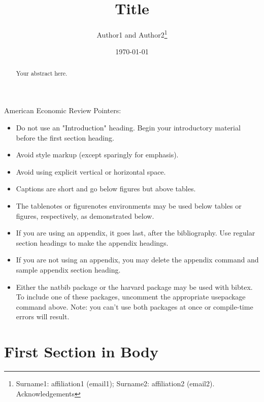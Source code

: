 \documentclass[AER]{AEA}
\begin{document}
\title{Title}
\author{Author1 and Author2\thanks{Surname1: affiliation1 (email1); 
Surname2: affiliation2 (email2). Acknowledgements}}
\date{\today}

\begin{abstract}
Your abstract here.
\end{abstract}


\maketitle

American Economic Review Pointers:

\begin{itemize}
\item Do not use an "Introduction" heading. Begin your introductory material
before the first section heading.

\item Avoid style markup (except sparingly for emphasis).

\item Avoid using explicit vertical or horizontal space.

\item Captions are short and go below figures but above tables.

\item The tablenotes or figurenotes environments may be used below tables
or figures, respectively, as demonstrated below.

\item If you are using an appendix, it goes last, after the bibliography.
Use regular section headings to make the appendix headings.

\item If you are not using an appendix, you may delete the appendix command
and sample appendix section heading.

\item Either the natbib package or the harvard package may be used with bibtex.
To include one of these packages, uncomment the appropriate usepackage command
above. Note: you can't use both packages at once or compile-time errors will result.

\end{itemize}

\section{First Section in Body}
\end{document}
